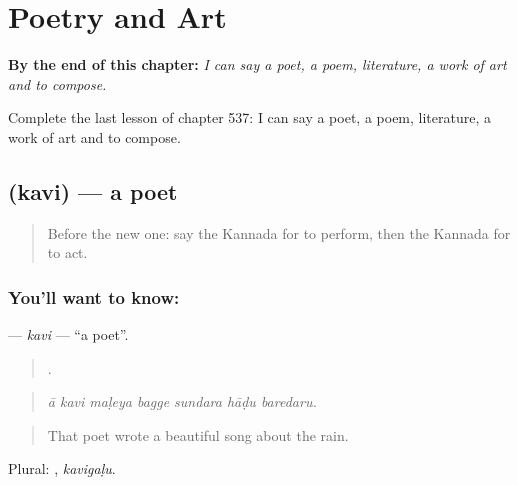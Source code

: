 
\chapter{Poetry and Art}
\label{ch:ka-poetry-and-art}

\begin{chapteropening}
\textbf{By the end of this chapter:} \emph{I can say a poet, a poem, literature, a work of art and to compose.}

Complete the last lesson of chapter 537: I can say a poet, a poem, literature, a work of art and to compose.
\end{chapteropening}

\section[\texorpdfstring{\kn{ಕವಿ} (kavi)}{ಕವಿ (kavi)}]{ (kavi) — a poet}

\label{lesson:KA-C537-kavi}



\begin{quote}
Before the new one: say the Kannada for to perform, then the Kannada for to act.
\end{quote}

\subsection*{You'll want to know: }
\textbf{} — \emph{kavi} — \textquotedblleft{}a poet\textquotedblright{}.

\begin{quote}
      .
\end{quote}

\begin{quote}
\emph{ā kavi maḷeya bagge sundara hāḍu baredaru.}
\end{quote}

\begin{quote}
That poet wrote a beautiful song about the rain.
\end{quote}

Plural: , \emph{kavigaḷu}.

